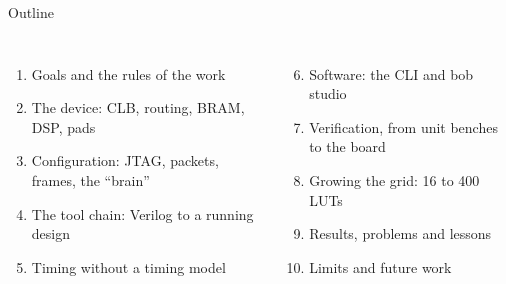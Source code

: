 \documentclass[aspectratio=169,11pt]{beamer}
\begin{document}
\begin{frame}{Outline}
  \begin{columns}[T]
    \begin{enumerate}
      \item Goals and the rules of the work
      \item The device: CLB, routing, BRAM, DSP, pads
      \item Configuration: JTAG, packets, frames, the ``brain''
      \item The tool chain: Verilog to a running design
      \item Timing without a timing model
    \end{enumerate}
    \begin{enumerate}\setcounter{enumi}{5}
      \item Software: the CLI and bob studio
      \item Verification, from unit benches to the board
      \item Growing the grid: 16 to 400 LUTs
      \item Results, problems and lessons
      \item Limits and future work
    \end{enumerate}
  \end{columns}
\end{frame}

\end{document}
